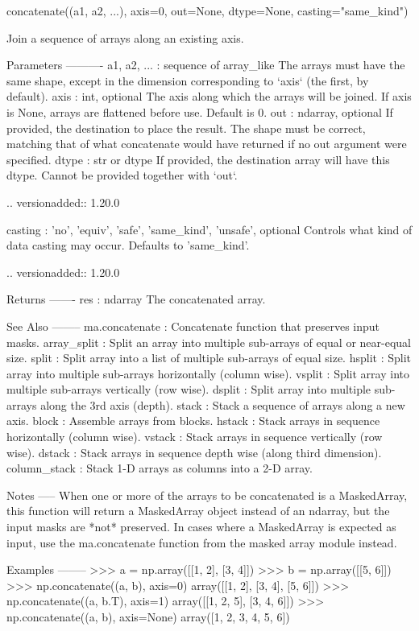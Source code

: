 \begin{DoxyVerb}concatenate((a1, a2, ...), axis=0, out=None, dtype=None, casting="same_kind")

Join a sequence of arrays along an existing axis.

Parameters
----------
a1, a2, ... : sequence of array_like
    The arrays must have the same shape, except in the dimension
    corresponding to `axis` (the first, by default).
axis : int, optional
    The axis along which the arrays will be joined.  If axis is None,
    arrays are flattened before use.  Default is 0.
out : ndarray, optional
    If provided, the destination to place the result. The shape must be
    correct, matching that of what concatenate would have returned if no
    out argument were specified.
dtype : str or dtype
    If provided, the destination array will have this dtype. Cannot be
    provided together with `out`.

    .. versionadded:: 1.20.0

casting : {'no', 'equiv', 'safe', 'same_kind', 'unsafe'}, optional
    Controls what kind of data casting may occur. Defaults to 'same_kind'.

    .. versionadded:: 1.20.0

Returns
-------
res : ndarray
    The concatenated array.

See Also
--------
ma.concatenate : Concatenate function that preserves input masks.
array_split : Split an array into multiple sub-arrays of equal or
              near-equal size.
split : Split array into a list of multiple sub-arrays of equal size.
hsplit : Split array into multiple sub-arrays horizontally (column wise).
vsplit : Split array into multiple sub-arrays vertically (row wise).
dsplit : Split array into multiple sub-arrays along the 3rd axis (depth).
stack : Stack a sequence of arrays along a new axis.
block : Assemble arrays from blocks.
hstack : Stack arrays in sequence horizontally (column wise).
vstack : Stack arrays in sequence vertically (row wise).
dstack : Stack arrays in sequence depth wise (along third dimension).
column_stack : Stack 1-D arrays as columns into a 2-D array.

Notes
-----
When one or more of the arrays to be concatenated is a MaskedArray,
this function will return a MaskedArray object instead of an ndarray,
but the input masks are *not* preserved. In cases where a MaskedArray
is expected as input, use the ma.concatenate function from the masked
array module instead.

Examples
--------
>>> a = np.array([[1, 2], [3, 4]])
>>> b = np.array([[5, 6]])
>>> np.concatenate((a, b), axis=0)
array([[1, 2],
       [3, 4],
       [5, 6]])
>>> np.concatenate((a, b.T), axis=1)
array([[1, 2, 5],
       [3, 4, 6]])
>>> np.concatenate((a, b), axis=None)
array([1, 2, 3, 4, 5, 6])


\end{DoxyVerb}
